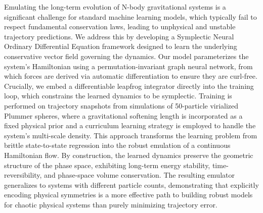 \documentclass[]{article}
\begin{document}
Emulating the long-term evolution of N-body gravitational systems is a significant challenge for standard machine learning models, which typically fail to respect fundamental conservation laws, leading to unphysical and unstable trajectory predictions. We address this by developing a Symplectic Neural Ordinary Differential Equation framework designed to learn the underlying conservative vector field governing the dynamics. Our model parameterizes the system's Hamiltonian using a permutation-invariant graph neural network, from which forces are derived via automatic differentiation to ensure they are curl-free. Crucially, we embed a differentiable leapfrog integrator directly into the training loop, which constrains the learned dynamics to be symplectic. Training is performed on trajectory snapshots from simulations of 50-particle virialized Plummer spheres, where a gravitational softening length is incorporated as a fixed physical prior and a curriculum learning strategy is employed to handle the system's multi-scale density. This approach transforms the learning problem from brittle state-to-state regression into the robust emulation of a continuous Hamiltonian flow. By construction, the learned dynamics preserve the geometric structure of the phase space, exhibiting long-term energy stability, time-reversibility, and phase-space volume conservation. The resulting emulator generalizes to systems with different particle counts, demonstrating that explicitly encoding physical symmetries is a more effective path to building robust models for chaotic physical systems than purely minimizing trajectory error.
\end{document}

